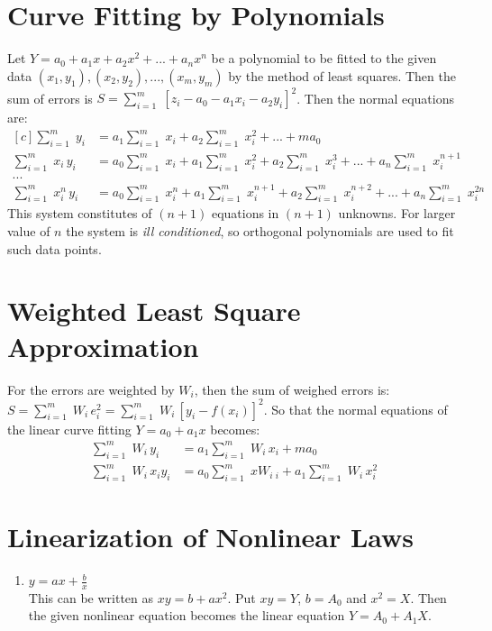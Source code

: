 \documentclass[aima203_lecturenotes_ku.tex]{subfiles}
\begin{document}
\section{Curve Fitting by Polynomials}
Let $Y = a_0 + a_1x +a_2x^2+ ...+ a_nx^n$ be a polynomial to be fitted to the given data $(x_1,y_1), (x_2,y_2),...,(x_m,y_m)$ by the method of least squares. Then the sum of errors is $\displaystyle S = \sum_{i=1}^m \; [z_i - a_0 - a_1x_i-a_2y_i]^2$. Then the normal equations are:
\begin{equation}
  \label{polynormal}
  \begin{aligned}[c]
    \sum_{i=1}^m \; y_i &= a_1 \sum_{i=1}^m \;x_i + a_2 \sum_{i=1}^m \;x_i^2 + ...+ ma_0 \\[1mm]
    \sum_{i=1}^m \; x_i\,y_i &= a_0\sum_{i=1}^m \;x_i + a_1 \sum_{i=1}^m \;x_i^2 + a_2 \sum_{i=1}^m \;x_i^3 + ... + a_n \sum_{i=1}^m\; x_i^{n+1} \\[1mm]
    ... \\[1mm]
    \sum_{i=1}^m \; x_i^n\,y_i &= a_0\sum_{i=1}^m \;x_i^n + a_1 \sum_{i=1}^m \;x_i^{n+1} + a_2 \sum_{i=1}^m \;x_i^{n+2} + ... + a_n \sum_{i=1}^m\; x_i^{2n}
  \end{aligned}
\end{equation}
This system constitutes of $(n+1)$ equations in $(n+1)$ unknowns. For larger value of $n$ the system is \textit{ill conditioned}, so orthogonal polynomials are used to fit such data points.

\section{Weighted Least Square Approximation}
For the errors are weighted by $W_i$, then the sum of weighed errors is: \\
$\displaystyle S= \sum_{i=1} ^ m\; W_i\, e_i^2 =  \sum_{i=1} ^ m \; W_i\, [y_i - f(x_i)]^2$. So that the normal equations of the linear curve fitting $Y=a_0 +a_1x$ becomes:
\begin{equation}
\begin{aligned}
  \sum_{i=1}^m \;W_i\, y_i &= a_1 \sum_{i=1}^m \;W_i\,x_i + ma_0 \\[1mm]
  \sum_{i=1}^m \; W_i\,x_iy_i &= a_0\sum_{i=1}^m \;xW_i\,_i + a_1 \sum_{i=1}^m \;W_i\,x_i^2
\end{aligned}
\end{equation}

\section{Linearization of Nonlinear Laws}
\begin{enumerate}
\item $\displaystyle y =ax + \frac{b}{x}$ \\[1mm]
This can be written as $xy = b + ax^2$. Put $xy=Y$, $b=A_0$ and $x^2 = X$. Then the given nonlinear equation becomes the linear equation $Y = A_0 + A_1X$.
\end{enumerate}

\item
\end{document}
